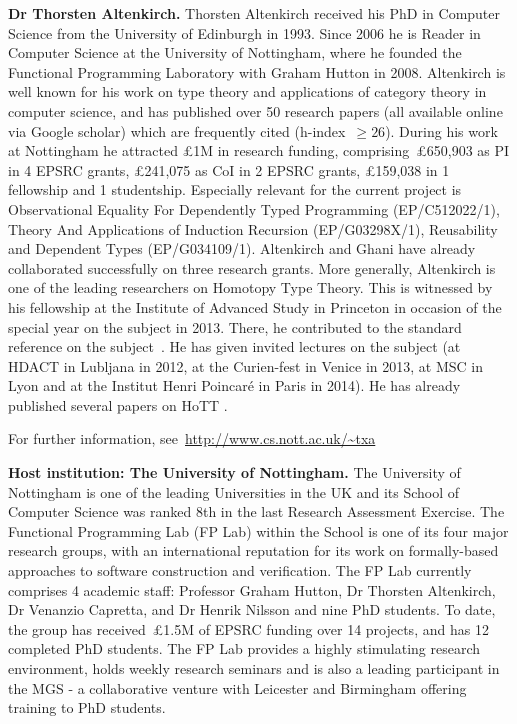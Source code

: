 \documentclass[a4paper,11pt]{article}
\begin{document}
\textbf{Dr Thorsten Altenkirch.}  Thorsten Altenkirch received his PhD in
Computer Science from the University of Edinburgh in 1993. Since 2006
he is Reader in Computer Science at the University of Nottingham,
where he founded the Functional Programming Laboratory with Graham
Hutton in 2008. Altenkirch is well known for his work on type theory
and applications of category theory in computer science, and has
published over 50 research papers (all available online via Google
scholar) which are frequently cited (h-index~$\geq 26$). During his
work at Nottingham he attracted \pounds 1M in research funding,
comprising~\pounds650,903 as PI in 4 EPSRC grants, \pounds241,075 as
CoI in 2 EPSRC grants, \pounds159,038 in 1 fellowship and 1
studentship. Especially relevant for the current project is
Observational Equality For Dependently Typed Programming
(EP/C512022/1), Theory And Applications of Induction Recursion
(EP/G03298X/1), Reusability and Dependent Types
(EP/G034109/1). Altenkirch and Ghani have already collaborated
successfully on three research grants. More generally, 
Altenkirch is one of the leading researchers on Homotopy Type Theory.
This is witnessed by his fellowship at the Institute of Advanced Study
in Princeton in occasion of the special year on the subject in 2013. There, he contributed to the standard reference on the
subject~\cite{hott-book}.  He has given invited lectures on the
subject (at HDACT in Lubljana in 2012, at the Curien-fest in Venice in
2013, at MSC in Lyon and at the Institut Henri Poincar\'e in Paris in
2014). He has already published several papers on HoTT
\cite{altenkirch:extSetoids,alti:ott-conf,alti:csl12,alti:tlca13-hedberg}.

For further information, see~\url{http://www.cs.nott.ac.uk/~txa}

\textbf{Host institution: The University of Nottingham.}  The
University of Nottingham is one of the leading Universities in the UK
and its School of Computer Science was ranked 8th in the last Research
Assessment Exercise. The Functional Programming Lab (FP Lab) within the School
is one of its four major research groups, with an international
reputation for its work on formally-based approaches to software
construction and verification.  The FP Lab currently comprises 4
academic staff: Professor Graham Hutton, Dr Thorsten Altenkirch, Dr
Venanzio Capretta, and Dr Henrik Nilsson and nine PhD students.  To
date, the group has received~\pounds1.5M of EPSRC funding over 14
projects, and has 12 completed PhD students.  The FP Lab provides a highly stimulating research environment,
holds weekly research seminars and is also a leading participant in the MGS - a
collaborative venture with Leicester and Birmingham offering training
to PhD students.
\noindent
\end{document}
